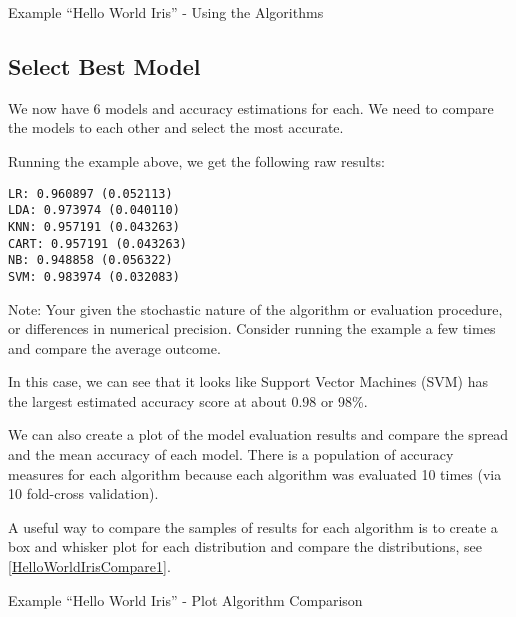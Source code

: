 \begin{code}
        
    
    \caption{Example ``Hello World Iris'' - Using the Algorithms} \label{HelloWorldIrisCompare3}
\end{code}        
    
    
\subsection{Select Best Model}

We now have 6 models and accuracy estimations for each. We need to compare the models to each other and select the most accurate.
    
Running the example above, we get the following raw results:

\begin{lstlisting}
LR: 0.960897 (0.052113)
LDA: 0.973974 (0.040110)
KNN: 0.957191 (0.043263)
CART: 0.957191 (0.043263)
NB: 0.948858 (0.056322)
SVM: 0.983974 (0.032083)
\end{lstlisting}    

\medskip

Note: Your   given the stochastic nature of the algorithm or evaluation procedure, or differences in numerical precision. Consider running the example a few times and compare the average outcome.
  
\medskip

In this case, we can see that it looks like Support Vector Machines (SVM) has the largest estimated accuracy score at about 0.98 or 98\%.
    
We can also create a plot of the model evaluation results and compare the spread and the mean accuracy of each model. There is a population of accuracy measures for each algorithm because each algorithm was evaluated 10 times (via 10 fold-cross validation).
    
A useful way to compare the samples of results for each algorithm is to create a box and whisker plot for each distribution and compare the distributions, see \ref{HelloWorldIrisCompare1}.

\begin{code}
      
    
  \caption{Example ``Hello World Iris'' - Plot Algorithm Comparison} \label{HelloWorldIrisCompare1}
\end{code}    

